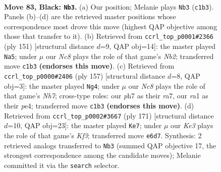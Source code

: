\documentclass[11pt]{article}
\begin{document}
\clearpage

\begin{figure}[p]\centering
\begin{subfigure}{0.46\textwidth}\centering
\resizebox{\linewidth}{!}{%
\newchessgame
\chessboard[
  setfen={8/7P/4k1p1/5p2/5P2/5K2/8/R1n5 b - - 0 83},
  showmover=false,
  pgfstyle=straightmove, color=movearrow, markmove={c1-b3}
]}
\caption{}
\end{subfigure}\hfill
\begin{subfigure}{0.46\textwidth}\centering
\resizebox{\linewidth}{!}{%
\newchessgame
\chessboard[
  setfen={8/1nR5/8/8/kp6/8/PK6/8 b - - 46 76},
  showmover=false,
  pgfstyle=straightmove, color=movearrow, markmove={b7-a5}
]}
\caption{}
\end{subfigure}
\\[4pt]
\begin{subfigure}{0.46\textwidth}\centering
\resizebox{\linewidth}{!}{%
\newchessgame
\chessboard[
  setfen={6k1/R7/8/4p3/3pP3/6P1/6Kn/8 b - - 14 79},
  showmover=false,
  pgfstyle=straightmove, color=movearrow, markmove={h2-g4}
]}
\caption{}
\end{subfigure}\hfill
\begin{subfigure}{0.46\textwidth}\centering
\resizebox{\linewidth}{!}{%
\newchessgame
\chessboard[
  setfen={3R4/8/3n1k2/6p1/6P1/5K2/8/8 b - - 30 86},
  showmover=false,
  pgfstyle=straightmove, color=movearrow, markmove={f6-e7}
]}
\caption{}
\end{subfigure}
\caption{\textbf{Move 83, Black: \texttt{Nb3}.} (a) Our position; Melanie plays \texttt{Nb3} (\texttt{c1b3}). Panels (b)--(d) are the retrieved master positions whose correspondence most drove this move (highest QAP objective among those that transfer to it). (b) Retrieved from \texttt{ccrl\_top\_p0001\#2366} (ply 151) [structural distance $d$=9, QAP obj=14]: the master played \texttt{Na5}; under $\mu$ our \emph{Nc8} plays the role of that game's \emph{Nb2}; transferred move \texttt{c1b3} \textbf{(endorses this move)}. (c) Retrieved from \texttt{ccrl\_top\_p0000\#2406} (ply 157) [structural distance $d$=8, QAP obj=3]: the master played \texttt{Ng4}; under $\mu$ our \emph{Nc8} plays the role of that game's \emph{Nh7}; cross-type roles: our \emph{p}h7 as their \emph{r}a7, our \emph{r}a1 as their \emph{p}e4; transferred move \texttt{c1b3} \textbf{(endorses this move)}. (d) Retrieved from \texttt{ccrl\_top\_p0002\#3667} (ply 171) [structural distance $d$=10, QAP obj=23]: the master played \texttt{Ke7}; under $\mu$ our \emph{Ke3} plays the role of that game's \emph{Kf3}; transferred move \texttt{e6d7}. Synthesis: 2 retrieved analogs transferred to \texttt{Nb3} (summed QAP objective 17, the strongest correspondence among the candidate moves); Melanie committed it via the \texttt{search} selector.}
\label{fig:thought-m165}
\end{figure}
\end{document}
